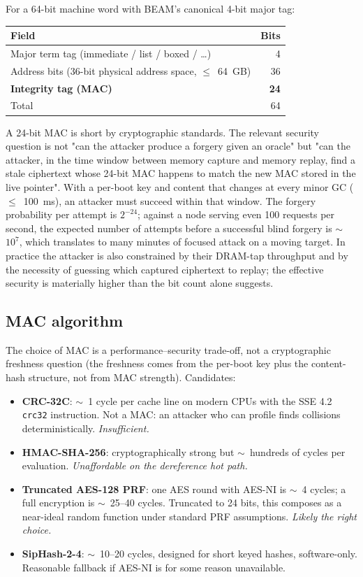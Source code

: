 \documentclass[10pt,a4paper]{article}
\begin{document}
For a 64-bit machine word with BEAM's canonical 4-bit major tag:

\begin{center}
\begin{tabular}{lr}
\toprule
\textbf{Field} & \textbf{Bits} \\
\midrule
Major term tag (immediate / list / boxed / \dots) & 4 \\
Address bits (36-bit physical address space, $\le$~64~GB) & 36 \\
\textbf{Integrity tag (MAC)} & \textbf{24} \\
\midrule
Total & 64 \\
\bottomrule
\end{tabular}
\end{center}

A 24-bit MAC is short by cryptographic standards. The relevant security
question is not "can the attacker produce a forgery given an oracle"
but "can the attacker, in the time window between memory capture and
memory replay, find a stale ciphertext whose 24-bit MAC happens to
match the new MAC stored in the live pointer".  With a per-boot key
and content that changes at every minor GC ($\le$~100~ms), an attacker
must succeed within that window. The forgery probability per attempt
is $2^{-24}$; against a node serving even 100 requests per second, the
expected number of attempts before a successful blind forgery is
$\sim$~$10^7$, which translates to many minutes of focused attack on a
moving target. In practice the attacker is also constrained by their
DRAM-tap throughput and by the necessity of guessing which captured
ciphertext to replay; the effective security is materially higher than
the bit count alone suggests.

\subsection{MAC algorithm}

The choice of MAC is a performance--security trade-off, not a cryptographic
freshness question (the freshness comes from the per-boot key plus the
content-hash structure, not from MAC strength). Candidates:

\begin{itemize}[label=---]
\item \textbf{CRC-32C}: $\sim$~1 cycle per cache line on modern CPUs
with the SSE 4.2 \texttt{crc32} instruction. Not a MAC: an attacker who
can profile finds collisions deterministically. \emph{Insufficient.}
\item \textbf{HMAC-SHA-256}: cryptographically strong but $\sim$~hundreds
of cycles per evaluation. \emph{Unaffordable on the dereference hot path.}
\item \textbf{Truncated AES-128 PRF}: one AES round with AES-NI is
$\sim$~4 cycles; a full encryption is $\sim$~25--40 cycles. Truncated
to 24 bits, this composes as a near-ideal random function under standard
PRF assumptions. \emph{Likely the right choice.}
\item \textbf{SipHash-2-4}: $\sim$~10--20 cycles, designed for short
keyed hashes, software-only. Reasonable fallback if AES-NI is for
some reason unavailable.
\end{itemize}
\end{document}
